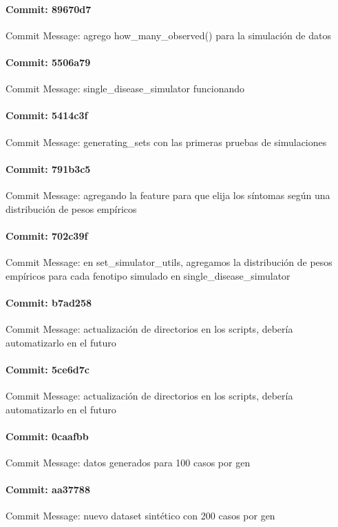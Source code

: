 \documentclass{article}
\begin{document}
\paragraph{Commit: 89670d7}
Commit Message: agrego how_many_observed() para la simulación de datos

\paragraph{Commit: 5506a79}
Commit Message: single_disease_simulator funcionando

\paragraph{Commit: 5414c3f}
Commit Message: generating_sets con las primeras pruebas de simulaciones

\paragraph{Commit: 791b3c5}
Commit Message: agregando la feature para que elija los síntomas según una distribución de pesos empíricos

\paragraph{Commit: 702c39f}
Commit Message: en set_simulator_utils, agregamos la distribución de pesos empíricos para cada fenotipo simulado en single_disease_simulator

\paragraph{Commit: b7ad258}
Commit Message: actualización de directorios en los scripts, debería automatizarlo en el futuro

\paragraph{Commit: 5ce6d7c}
Commit Message: actualización de directorios en los scripts, debería automatizarlo en el futuro

\paragraph{Commit: 0caafbb}
Commit Message: datos generados para 100 casos por gen

\paragraph{Commit: aa37788}
Commit Message: nuevo dataset sintético con 200 casos por gen
\end{document}
